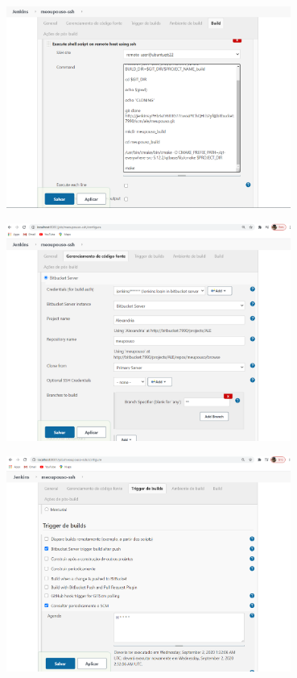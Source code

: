 \documentclass[10pt]{beamer}
\theoremstyle{remark}
\theoremstyle{definition}
\begin{document}
\begin{frame}[allowframebreaks]
	\framebreak
	
	\begin{center}
		\includegraphics[width=0.7\textwidth]{images/33.png}
	\end{center}
	
	\framebreak
	
	\begin{center}
		\includegraphics[width=0.7\textwidth]{images/34.png}
	\end{center}
	
	\framebreak
	
	\begin{center}
		\includegraphics[width=0.7\textwidth]{images/35.png}
	\end{center}
	

\end{frame}
\end{document}

